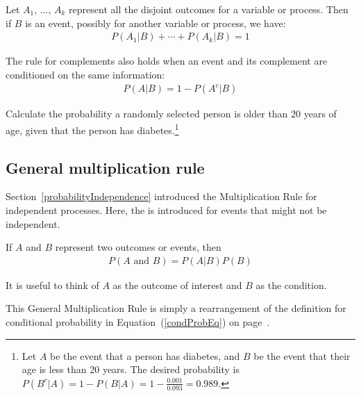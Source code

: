 \begin{termBox}{
Let $A_1$, ..., $A_k$ represent all the disjoint outcomes for a variable or process. Then if $B$ is an event, possibly for another variable or process, we have: \vspace{-1mm}
\begin{align*}
P(A_1|B)+\cdots+P(A_k|B) = 1
\end{align*}\vspace{-5.5mm} \par
The rule for complements also holds when an event and its complement are conditioned on the same information: \vspace{-1.5mm}
\begin{align*}
P(A | B) = 1 - P(A^c | B)
\end{align*}}
\end{termBox}

\begin{exercise} 
Calculate the probability a randomly selected person is older than 20 years of age, given that the person has diabetes.\footnote{Let $A$ be the event that a person has diabetes, and $B$ be the event that their age is less than 20 years. The desired probability is $P(B^c|A) = 1 - P(B|A) = 1 - \frac{0.001}{0.093} = 0.989$.}
\end{exercise}

\subsection{General multiplication rule}

Section~\ref{probabilityIndependence} introduced the Multiplication Rule for independent processes. Here, the  is introduced for events that might not be independent.

\begin{termBox}{
If $A$ and $B$ represent two outcomes or events, then \vspace{-1.5mm}
\begin{eqnarray*}
P(A\text{ and }B) = P(A | B) P(B)
\end{eqnarray*} \vspace{-6.5mm} \par
It is useful to think of $A$ as the outcome of interest and $B$ as the condition.}
\end{termBox}
This General Multiplication Rule is simply a rearrangement of the definition for conditional probability in Equation~(\ref{condProbEq}) on page~\pageref{condProbEq}.

